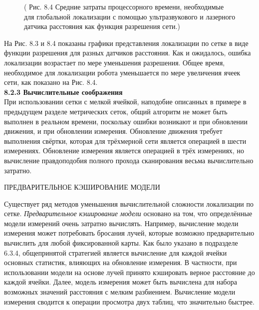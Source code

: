 \documentclass[10pt,a4paper]{article}
\begin{document}
\begin{figure}[H]
	\caption{ ( Рис. 8.4 Средние затраты процессорного времени, необходимые для глобальной локализации с помощью ультразвукового и лазерного датчика расстояния как функция разрешения сети.)}
	\label{fig:84orig}
\end{figure}

На Рис. 8.3 и 8.4 показаны графики представления локализации по сетке в виде функции разрешения для разных датчиков расстояния. Как и ожидалось, ошибка локализации возрастает по мере уменьшения разрешения. Общее время, необходимое для локализации робота уменьшается по мере увеличения ячеек сети, как показано на Рис. 8.4.\\

\textbf{8.2.3	Вычислительные соображения}\\

При использовании сетки с мелкой ячейкой, наподобие описанных в примере в предыдущем разделе метрических сеток, общий алгоритм не может быть выполнен в реальном времени, поскольку ошибки возникают и при обновлении движения, и при обновлении измерения. Обновление движения требует выполнения свёртки, которая для трёхмерной сети является операцией в шести измерениях. Обновление измерения является операцией в трёх измерениях, но вычисление правдоподобия полного прохода сканирования весьма вычислительно затратно.

ПРЕДВАРИТЕЛЬНОЕ КЭШИРОВАНИЕ МОДЕЛИ

Существует ряд методов уменьшения вычислительной сложности локализации по сетке.
\textit{Предварительное кэширование модели} основано на том, что определённые модели измерений очень затратно вычислять. Например, вычисление модели измерения может потребовать бросания лучей, которые возможно предварительно вычислить для любой фиксированной карты. Как было указано в подразделе 6.3.4, общепринятой стратегией является вычисление для каждой ячейки основных статистик, влияющих на обновление измерения. В частности, при использовании модели на основе лучей принято кэшировать верное расстояние до каждой ячейки.  Далее, модель измерения может быть вычислена для набора возможных значений расстояния с мелким разбиением. Вычисление модели измерения сводится к операции просмотра двух таблиц, что значительно быстрее. 
\end{document}

